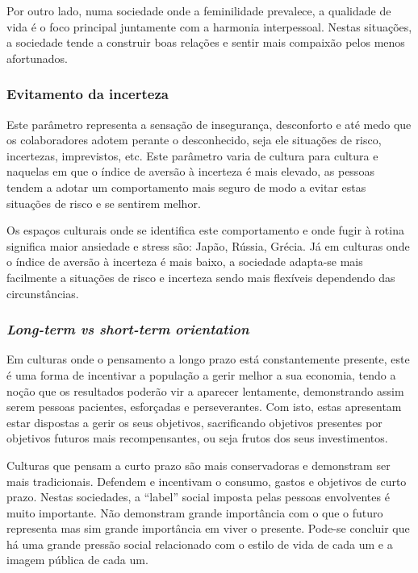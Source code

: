 Por outro lado, numa sociedade onde a feminilidade prevalece, a qualidade de vida é o foco principal juntamente com a harmonia interpessoal. Nestas situações, a sociedade tende a construir boas relações e sentir mais compaixão pelos menos afortunados.

\subsubsection{Evitamento da incerteza}

Este parâmetro representa a sensação de insegurança, desconforto e até medo que os colaboradores adotem perante o desconhecido, seja ele situações de risco, incertezas, imprevistos, etc. Este parâmetro varia de cultura para cultura e naquelas em que o índice de aversão à incerteza é mais elevado, as pessoas tendem a adotar um comportamento mais seguro de modo a evitar estas situações de risco e se sentirem melhor.

Os espaços culturais onde se identifica este comportamento e onde fugir à rotina significa maior ansiedade e stress são: Japão, Rússia, Grécia. Já em culturas onde o índice de aversão à incerteza é mais baixo, a sociedade adapta-se mais facilmente a situações de risco e incerteza sendo mais flexíveis dependendo das circunstâncias.

\subsubsection{\textit{Long-term vs short-term orientation}}

Em culturas onde o pensamento a longo prazo está constantemente presente, este é uma forma de incentivar a população a gerir melhor a sua economia, tendo a noção que os resultados poderão vir a aparecer lentamente, demonstrando assim serem pessoas pacientes, esforçadas e perseverantes. Com isto, estas apresentam estar dispostas a gerir os seus objetivos, sacrificando objetivos presentes por objetivos futuros mais recompensantes, ou seja frutos dos seus investimentos. 

Culturas que pensam a curto prazo são mais conservadoras e demonstram ser mais tradicionais. Defendem e incentivam o consumo, gastos e objetivos de curto prazo. Nestas sociedades, a “label” social imposta pelas pessoas envolventes é muito importante. Não demonstram grande importância com o que o futuro representa mas sim grande importância em viver o presente. Pode-se concluir que há uma grande pressão social relacionado com o estilo de vida de cada um e a imagem pública de cada um.

